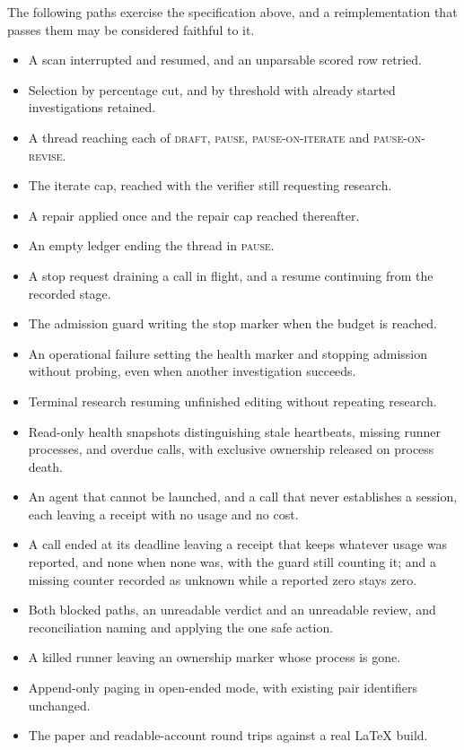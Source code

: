 \documentclass[11pt,a4paper]{article}
\newcommand{\st}[1]{\textsc{#1}}
\begin{document}
The following paths exercise the specification above, and a reimplementation
that passes them may be considered faithful to it.
\begin{itemize}
\item A scan interrupted and resumed, and an unparsable scored row retried.
\item Selection by percentage cut, and by threshold with already started
investigations retained.
\item A thread reaching each of \st{draft}, \st{pause}, \st{pause-on-iterate}
and \st{pause-on-revise}.
\item The iterate cap, reached with the verifier still requesting research.
\item A repair applied once and the repair cap reached thereafter.
\item An empty ledger ending the thread in \st{pause}.
\item A stop request draining a call in flight, and a resume continuing from the
recorded stage.
\item The admission guard writing the stop marker when the budget is reached.
\item An operational failure setting the health marker and stopping admission
without probing, even when another investigation succeeds.
\item Terminal research resuming unfinished editing without repeating research.
\item Read-only health snapshots distinguishing stale heartbeats, missing runner
processes, and overdue calls, with exclusive ownership released on process death.
\item An agent that cannot be launched, and a call that never establishes a
session, each leaving a receipt with no usage and no cost.
\item A call ended at its deadline leaving a receipt that keeps whatever usage
was reported, and none when none was, with the guard still counting it; and a
missing counter recorded as unknown while a reported zero stays zero.
\item Both blocked paths, an unreadable verdict and an unreadable review, and
reconciliation naming and applying the one safe action.
\item A killed runner leaving an ownership marker whose process is gone.
\item Append-only paging in open-ended mode, with existing pair identifiers
unchanged.
\item The paper and readable-account round trips against a real LaTeX build.
\end{itemize}
\end{document}
